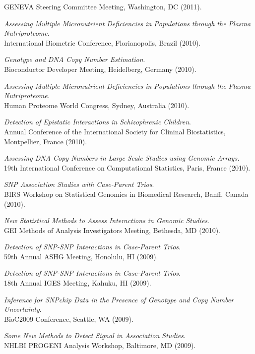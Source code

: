 \documentclass[10pt]{article}
\newcommand{\dn}[1]{{\color{black} {#1}}}
\begin{document}
GENEVA Steering Committee Meeting, \dn{Washington, DC} 
(2011).
\item
{\it Assessing Multiple Micronutrient Deficiencies in Populations through the Plasma Nutriproteome}.\\
International Biometric Conference, \dn{Florianopolis, Brazil}
(2010).
\item
{\it Genotype and DNA Copy Number Estimation}.\\
Bioconductor Developer Meeting, \dn{Heidelberg, Germany}
(2010).
\item
{\it Assessing Multiple Micronutrient Deficiencies in Populations through the Plasma Nutriproteome.}\\
Human Proteome World Congress, Sydney, Australia 
(2010).
\item
{\it Detection of Epistatic Interactions in Schizophrenic Children}.\\
Annual Conference of the International Society for Clininal Biostatistics, \dn{Montpellier, France}
(2010).
\item
{\it Assessing DNA Copy Numbers in Large Scale Studies using Genomic Arrays.}\\
19th International Conference on Computational Statistics, Paris, France
(2010).
\item
{\it SNP Association Studies with Case-Parent Trios}.\\
BIRS Workshop on Statistical Genomics in Biomedical Research, \dn{Banff, Canada}
(2010).
\item
{\it New Statistical Methods to Assess Interactions in Genomic Studies}.\\
GEI Methods of Analysis Investigators Meeting, \dn{Bethesda, MD}
(2010).
\item
{\it Detection of SNP-SNP Interactions in Case-Parent Trios}.\\
59th Annual ASHG Meeting, Honolulu, HI
(2009).
\item
{\it Detection of SNP-SNP Interactions in Case-Parent Trios}.\\
18th Annual IGES Meeting, Kahuku, HI
(2009).
\item
{\it Inference for SNPchip Data in the Presence of Genotype and Copy Number Uncertainty}.\\
BioC2009 Conference, \dn{Seattle, WA}
(2009).
\item
{\it Some New Methods to Detect Signal in Association Studies}.\\ 
NHLBI PROGENI Analysis Workshop, \dn{Baltimore, MD}
(2009).
\item
\end{document}
